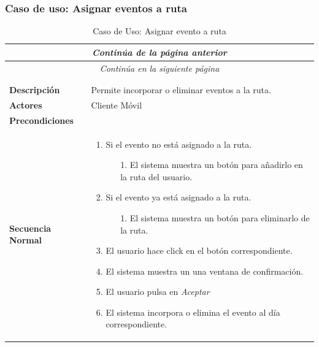 \newpage
\subsubsection*{Caso de uso: Asignar eventos a ruta }
\begin{longtable}{| p{4cm} | p{10cm} |}
\endfirsthead
\multicolumn{2}{c}{\textit{Continúa de la página anterior}}\\[12pt]
\hline
\endhead
\hline
\multicolumn{2}{c}{\textit{Continúa en la siguiente página}} \\
\endfoot
\hline
\caption{Caso de Uso: Asignar evento a ruta}\label{fig:1}\\
\endlastfoot


\hline
\multicolumn{2}{|c|}{\textbf{CU$<$12$>$ - Asignar Evento a ruta}} \\

\hline
\textbf{Descripción} &
Permite incorporar o eliminar eventos a la ruta.\\

\hline
\textbf{Actores} &
Cliente Móvil\\

\hline
\textbf{Precondiciones} &
\\

\hline
\textbf{Secuencia Normal} &\mbox{}\par\vspace{-\baselineskip}
\begin{enumerate}[leftmargin=0.7cm, topsep=0.1cm]
\item Si el evento no está asignado a la ruta.
	\begin{itemize}
	\item[1.] El sistema muestra un botón para añadirlo en la ruta del usuario.
	\end{itemize}
\item Si el evento ya está asignado a la ruta.
	\begin{itemize}
	\item[1.] El sistema muestra un botón para eliminarlo de la ruta.
	\end{itemize}
\item El usuario hace click en el botón correspondiente.
\item El sistema muestra un una ventana de confirmación.
\item El usuario pulsa en \textit{Aceptar}
\item El sistema incorpora o elimina el evento al día correspondiente.
\end{enumerate}



\end{longtable}
